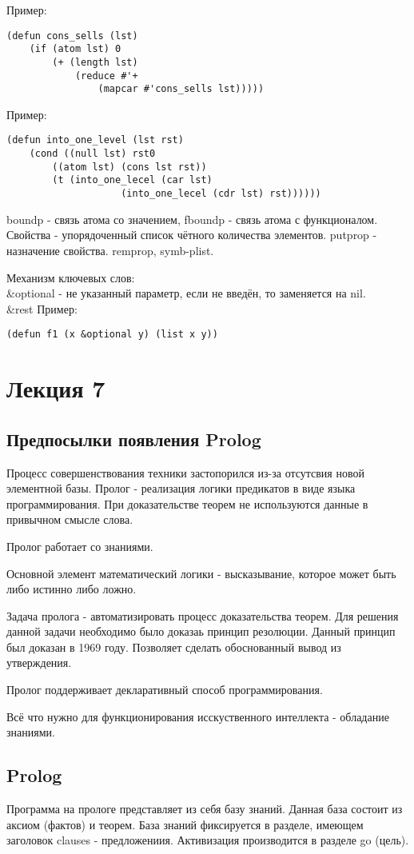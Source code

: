 Пример:
\begin{lstlisting}
(defun cons_sells (lst)
	(if (atom lst) 0
		(+ (length lst)
			(reduce #'+
				(mapcar #'cons_sells lst)))))
\end{lstlisting}

Пример:
\begin{lstlisting}
(defun into_one_level (lst rst)
	(cond ((null lst) rst0
		((atom lst) (cons lst rst))
		(t (into_one_lecel (car lst)
					(into_one_lecel (cdr lst) rst))))))
\end{lstlisting}

boundp - связь атома со значением, fboundp - связь атома с функционалом. Свойства - упорядоченный список чётного количества элементов. putprop - назначение свойства. remprop, symb-plist.

Механизм ключевых слов:\\
\&optional - не указанный параметр, если не введён, то заменяется на nil.\\
\&rest
Пример:
\begin{lstlisting}
(defun f1 (x &optional y) (list x y))
\end{lstlisting}

\chapter{Лекция 7}
\section{Предпосылки появления Prolog}
Процесс совершенствования техники застопорился из-за отсутсвия новой элементной базы. Пролог - реализация логики предикатов в виде языка программирования. При доказательстве теорем не используются данные в привычном смысле слова.

Пролог работает со знаниями. 

Основной элемент математический логики - высказывание, которое может быть либо истинно либо ложно. 

Задача пролога - автоматизировать процесс доказательства теорем. Для решения данной задачи необходимо было доказаь принцип резолюции. Данный принцип был доказан в 1969 году. Позволяет сделать обоснованный вывод из утверждения. 

Пролог поддерживает декларативный способ программирования.

Всё что нужно для функционирования исскуственного интеллекта - обладание знаниями.

\section{Prolog}
Программа на прологе представляет из себя базу знаний. Данная база состоит из аксиом (фактов) и теорем. База знаний фиксируется в разделе, имеющем заголовок clauses - предложениия. Активизация производится в разделе go (цель).

